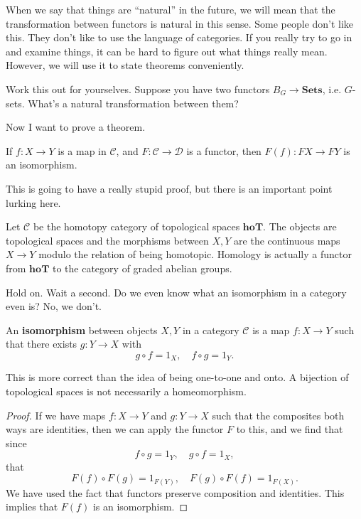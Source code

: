 When we say that things are ``natural'' in the future, we will mean that the
transformation between functors is natural in this sense. 
Some people don't like this. They don't like to use the language of categories.
If you really try to go in and examine things, it can be hard to figure out
what things really mean.
However, we will use it to state theorems conveniently. 


\begin{exercise} 
Work this out for yourselves. Suppose you have two functors $B_G \to
\mathbf{Sets}$, i.e. $G$-sets. What's a natural transformation between them?
\end{exercise} 

Now I want to prove a theorem.
\begin{theorem} 
If $f: X \to Y$ is a map in $\mathcal{C}$, and $F: \mathcal{C} \to \mathcal{D}$
is a functor, then $F(f): FX \to FY$ is an isomorphism. 
\end{theorem} 
This is going to have a really stupid proof, but there is an important point
lurking here.
\begin{example} 
Let $\mathcal{C}$ be the homotopy category of topological spaces
$\mathbf{hoT}$. The objects are topological spaces and the morphisms between
$X, Y$ are the continuous maps $X \to Y$ modulo the relation of being
homotopic. Homology is actually a functor from $\mathbf{hoT}$ to the category
of graded abelian groups.
\end{example} 


Hold on. Wait a second. Do we even know what an isomorphism in a category even
is? No, we don't.

\begin{definition} 
An \textbf{isomorphism} between objects $X, Y$ in a category $\mathcal{C}$ is a
map $f: X \to Y$ such that there exists $g: Y \to X$ with 
\[ g \circ f = 1_X, \quad f \circ g = 1_Y.  \]
\end{definition} 

This is more correct than the idea of being one-to-one and onto. A bijection of
topological spaces is not necessarily a homeomorphism.


\begin{proof} 
If we have maps $f: X \to Y$ and $g : Y \to X$ such that the composites both
ways are identities, then we can apply the functor $F$ to this, and we find that since
\[ f \circ g = 1_Y, \quad g \circ f = 1_X,   \]
that
\[ F(f) \circ F(g) = 1_{F(Y)}, \quad F(g) \circ F(f) = 1_{F(X)}.  \]
We have used the fact that functors preserve composition and identities. This
implies that $F(f)$ is an isomorphism. 
\end{proof} 


